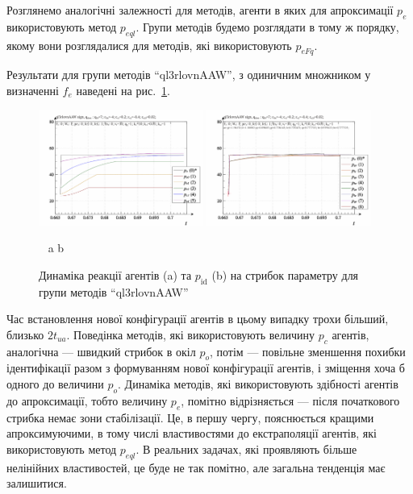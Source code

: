 
Розглянемо аналогічні залежності для методів, агенти в яких
для апроксимації
$ p_e $ використовують метод
$ p_{eql} $. Групи методів будемо розглядати в тому ж порядку, якому
вони розглядалися для методів, які використовують
$ p_{eFq} $.

Результати для групи методів ``ql3rlovnAAW'', з одиничним множником
у визначенні
$ f_e $ наведені на рис.~\ref{atu:f:ql3rlovnAAW_sign}.

\begin{figure}[htb!]
  \begin{center}
    \includegraphics[width=0.48\textwidth]{p/sign/qls-p_t_pi_m_ql3rlovnAAW_sign.png}
    \hfill
    \includegraphics[width=0.48\textwidth]{p/sign/qls-p_t_p_m_ql3rlovnAAW_sign.png}
  \end{center}
  \vspace{-1.0ex}
  \begin{center}
    ~ \hfill a \hfill\hfill b  \hfill ~
  \end{center}
  \vspace{-1.5ex}
  \caption{Динаміка реакції агентів (a) та $p_\mathrm{id}$ (b) на стрибок параметру для групи методів ``ql3rlovnAAW''}
  \label{atu:f:ql3rlovnAAW_sign}
\end{figure}

Час встановлення нової конфігурації агентів в цьому випадку
трохи більший, близько
$ 2 t_{ua} $. Поведінка методів, які використовують величину
$ p_c $ агентів, аналогічна --- швидкий стрибок в окіл
$ p_o $, потім --- повільне зменшення похибки ідентифікації разом
з формуванням нової конфігурації агентів, і зміщення хоча б
одного до величини
$ p_o $. Динаміка методів, які використовують
здібності агентів до апроксимації, тобто величину
$ p_e $, помітно відрізняється --- після початкового стрибка немає
зони стабілізації. Це, в першу чергу, пояснюється кращими
апроксимуючими, в тому числі властивостями до екстраполяції
агентів, які використовують метод
$ p_{eql} $. В реальних задачах, які проявляють більше нелінійних
властивостей, це буде не так помітно, але загальна тенденція має
залишитися.

